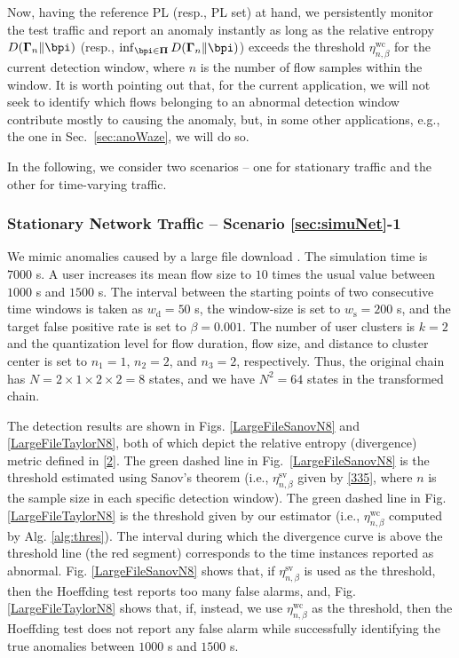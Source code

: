 \documentclass[10pt, twocolumn]{IEEEtran}
\begin{document}
Now, having the reference PL (resp., PL set) at hand, we persistently
monitor the test traffic and report an anomaly instantly as long as the
relative entropy $D( { {{\boldsymbol{\Gamma} _n}} \|{\bpi} } )$ (resp.,
$\mathop {\inf }_{\bpi \in \boldsymbol{\Pi} } D( {{\boldsymbol{\Gamma}
    _n} \| \bpi } )$) exceeds the threshold $\eta_{n,\beta}^{\text{wc}}$ for the
current detection window, where $n$ is the number of flow samples within
the window. It is worth pointing out that, for the current application,
we will not seek to identify which flows belonging to an abnormal
detection window contribute mostly to causing the anomaly, but, in some
other applications, e.g., the one in Sec.~\ref{sec:anoWaze}, we will do
so.

In the following, we consider two scenarios -- one for stationary
traffic and the other for time-varying traffic.

\subsubsection{Stationary Network Traffic -- Scenario
  \ref{sec:simuNet}-1} 

We mimic anomalies caused by a large file download
\cite[Sec. IV.A.2]{wa-ro-ca-pa-anomaly-cdc13}. The simulation time is
$7000$ s. A user increases its mean flow size to $10$ times the usual
value between $1000$ s and $1500$ s. The interval between the starting
points of two consecutive time windows is taken as $w_{\text{d}} = 50$ s, the
window-size is set to $w_{\text{s}} = 200$ s, and the target false positive rate
is set to $\beta = 0.001$. The number of user clusters is $k = 2$ and
the quantization level for flow duration, flow size, and distance to
cluster center is set to $n_1 = 1$, $n_2 = 2$, and $n_3 = 2$,
respectively. Thus, the original chain has $N = 2 \times 1 \times 2
\times 2 = 8$ states, and we have $N^2 = 64$ states in the transformed
chain.

The detection results are shown in Figs. \ref{LargeFileSanovN8} and
\ref{LargeFileTaylorN8}, both of which depict the relative entropy
(divergence) metric defined in \eqref{2}. The green dashed line in
Fig.~\ref{LargeFileSanovN8} is the threshold estimated using Sanov's
theorem (i.e., $\eta_{n,\beta}^{\text{sv}}$ given by \eqref{335}, where $n$ is the
sample size in each specific detection window). The green dashed line in
Fig. \ref{LargeFileTaylorN8} is the threshold given by our estimator
(i.e., $\eta_{n,\beta}^{\text{wc}}$ computed by Alg. \ref{alg:thres}). The interval
during which the divergence curve is above the threshold line (the red
segment) corresponds to the time instances reported as abnormal.
Fig. \ref{LargeFileSanovN8} shows that, if $\eta_{n,\beta}^{\text{sv}}$ is used as the
threshold, then the Hoeffding test reports too many false alarms, and,
Fig. \ref{LargeFileTaylorN8} shows that, if, instead, we use
$\eta_{n,\beta}^{\text{wc}}$ as the threshold, then the Hoeffding test does not report
any false alarm while successfully identifying the true anomalies
between $1000$ s and $1500$ s.
\end{document}
